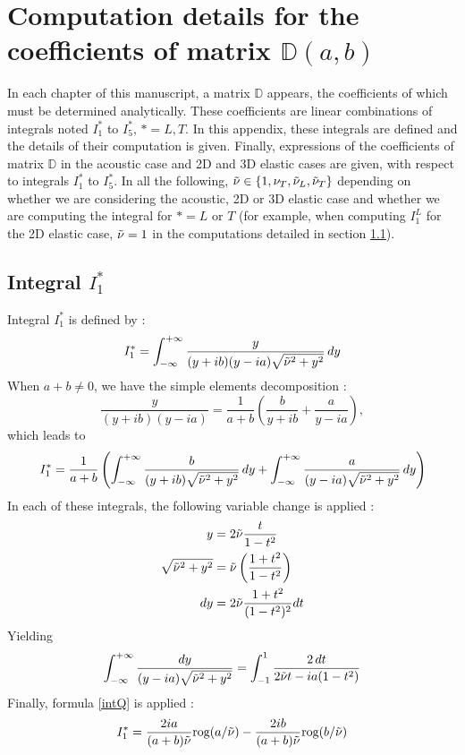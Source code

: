 \chapter{Computation details for the coefficients of matrix $\mathbb{D}(a,b)$}
\label{matD}
In each chapter of this manuscript, a matrix $\mathbb{D}$ appears, the coefficients of which must be determined analytically. These coefficients are linear combinations of integrals noted $I_1^*$ to $I_5^*,\,*=L,T$. In this appendix, these integrals are defined and the details of their computation is given. Finally, expressions of the coefficients of matrix $\mathbb{D}$ in the acoustic case and 2D and 3D elastic cases are given, with respect to integrals $I_1^*$ to $I_5^*$. In all the following, $\tilde{\nu} \in \{ 1,\nu_T,\tilde{\nu}_L,\tilde{\nu}_T \}$ depending on whether we are considering the acoustic, 2D or 3D elastic case and whether we are computing the integral for $*=L$ or $T$ (for example, when computing $I_1^L$ for the 2D elastic case, $\tilde{\nu}=1$ in the computations detailed in section \ref{calcI1}).

\section{Integral $I_1^*$}
\label{calcI1}
Integral $I_1^*$ is defined by :
\begin{equation}
\label{defI1}
I_1^*=\int_{-\infty}^{+\infty} \frac{y}{(y+ib)(y-ia)\sqrt{\tilde{\nu}^2+y^2}}\,dy
\end{equation}
When $a+b \neq 0$, we have the simple elements decomposition :
\begin{equation}
\frac{y}{(y+ib)(y-ia)}=\frac{1}{a+b} \left( \frac{b}{y+ib}+\frac{a}{y-ia} \right), 
\label{decomp2}
\end{equation}
which leads to
\begin{equation}
I_1^*= \frac{1}{a+b} \left( \int_{-\infty}^{+\infty} \frac{b}{(y+ib)\sqrt{\tilde{\nu}^2+y^2}} \,dy +\int_{-\infty}^{+\infty} \frac{a}{(y-ia)\sqrt{\tilde{\nu}^2+y^2}} \,dy \right)
\end{equation}
In each of these integrals, the following variable change is applied :
\begin{equation}
\begin{split}
 y&=2\tilde{\nu} \frac{t}{1-t^2} \\
\sqrt{\tilde{\nu}^2+y^2}&=\tilde{\nu}\left( \frac{1+t^2}{1-t^2} \right)  \\
 dy&= 2\tilde{\nu} \frac{1+t^2}{(1-t^2)^2}dt 
\end{split}
\label{changevar}
\end{equation}
Yielding
\begin{equation}
\int_{-\infty}^{+\infty} \frac{dy}{(y-ia)\sqrt{\tilde{\nu}^2+y^2}}=\int_{-1}^1\frac{2\,dt}{2\tilde{\nu} t-ia(1-t^2)}
\end{equation}
Finally, formula \eqref{intQ} is applied :
\begin{equation}
I_1^*=\frac{2ia}{(a+b)\tilde{\nu}}\mbox{rog}(a/\tilde{\nu})-\frac{2ib}{(a+b)\tilde{\nu}}\mbox{rog}(b/\tilde{\nu})
\label{valI1}
\end{equation}

